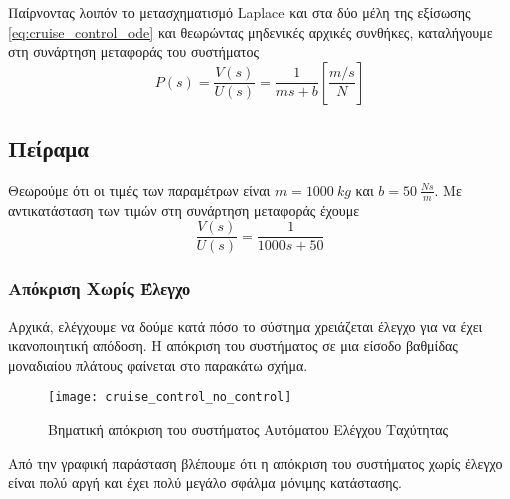 Παίρνοντας λοιπόν το μετασχηματισμό Laplace και στα δύο μέλη της εξίσωσης \ref{eq:cruise_control_ode} και θεωρώντας μηδενικές αρχικές συνθήκες, καταλήγουμε στη συνάρτηση μεταφοράς του συστήματος
\begin{equation}
P(s) = \frac{V(s)}{U(s)} = \frac{1}{ms+b} \left[\frac{m/s}{N}\right]
\label{eq:cruise_control_laplace}
\end{equation}

\subsection{Πείραμα}

Θεωρούμε ότι οι τιμές των παραμέτρων είναι $m = 1000\ kg$ και $\displaystyle b = 50\ \frac{Ns}{m}$. Με αντικατάσταση των τιμών στη συνάρτηση μεταφοράς έχουμε
\begin{equation}
\frac{V(s)}{U(s)} = \frac{1}{1000s+50}
\end{equation}

\subsubsection{Απόκριση Χωρίς Έλεγχο}

Αρχικά, ελέγχουμε να δούμε κατά πόσο το σύστημα χρειάζεται έλεγχο για να έχει ικανοποιητική απόδοση. Η απόκριση του συστήματος σε μια είσοδο βαθμίδας μοναδιαίου πλάτους φαίνεται στο παρακάτω σχήμα.

\begin{figure}[h]
  \centering
  \texttt{[image: cruise\_control\_no\_control]}
  \caption{Βηματική απόκριση του συστήματος Αυτόματου Ελέγχου Ταχύτητας}
  \label{fig:cruise_control_no_control}
\end{figure}

Από την γραφική παράσταση βλέπουμε ότι η απόκριση του συστήματος χωρίς έλεγχο είναι πολύ αργή και έχει πολύ μεγάλο σφάλμα μόνιμης κατάστασης. 

%
%

